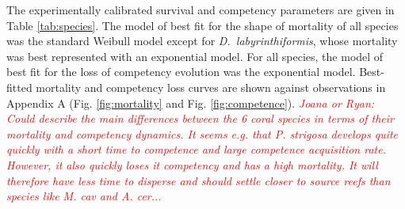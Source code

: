 \documentclass[preprint,12pt,authoryear]{elsarticle}
\newcommand{\emphc}[1]{\emph{\textcolor{red}{#1}}}
\begin{document}
The experimentally calibrated survival and competency parameters are given in Table \ref{tab:species}.  The model of best fit for the shape of mortality of all species was the standard Weibull model except for \textit{D.~labyrinthiformis}, whose mortality was best represented with an exponential model. For all species, the model of best fit for the loss of competency evolution was the exponential model. Best-fitted mortality and competency loss curves are shown against observations in Appendix A (Fig. \ref{fig:mortality} and Fig. \ref{fig:competence}). \emphc{Joana or Ryan: Could describe the main differences between the 6 coral species in terms of their mortality and competency dynamics. It seems e.g. that P. strigosa develops quite quickly with a short time to competence and large competence acquisition rate. However, it also quickly loses it competency and has a high mortality. It will therefore have less time to disperse and should settle closer to source reefs than species like M. cav and A. cer...}


%
\end{document}
